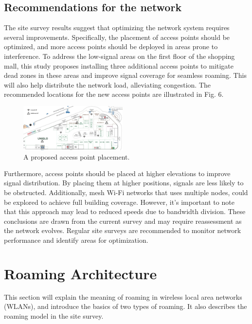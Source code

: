 \documentclass[conference]{IEEEtran}
\begin{document}
\subsection{Recommendations for the network}

The site survey results suggest that optimizing the network system requires several improvements. Specifically, the placement of access points should be optimized, and more access points should be deployed in areas prone to interference. To address the low-signal areas on the first floor of the shopping mall, this study proposes installing three additional access points to mitigate dead zones in these areas and improve signal coverage for seamless roaming. This will also help distribute the network load, alleviating congestion. The recommended locations for the new access points are illustrated in Fig. 6.

\begin{figure}[htbp]
    \centering
    \includegraphics[width=0.48\textwidth]{fig6_acesspoint_suggestion.png}
    \caption{A proposed access point placement.}
\end{figure}

Furthermore, access points should be placed at higher elevations to improve signal distribution. By placing them at higher positions, signals are less likely to be obstructed. Additionally, mesh Wi-Fi networks that uses multiple nodes, could be explored to achieve full building coverage. However, it's important to note that this approach may lead to reduced speeds due to bandwidth division. These conclusions are drawn from the current survey and may require reassessment as the network evolves. Regular site surveys are recommended to monitor network performance and identify areas for optimization.

\section{Roaming Architecture}

This section will explain the meaning of roaming in wireless local area networks (WLANs), and introduce the basics of two types of roaming. It also describes the roaming model in the site survey.
\end{document}
